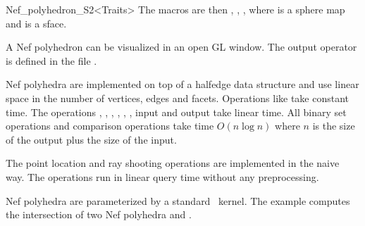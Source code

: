 \begin{ccRefClass}{Nef_polyhedron_S2<Traits>}
The macros are then ,
, ,
 where  is a sphere map
and  is a sface.

 A Nef polyhedron  can be
visualized in an open GL window. The output operator is defined in the
file .
   
\ccImplementation

Nef polyhedra are implemented on top of a halfedge data structure and
use linear space in the number of vertices, edges and facets.
Operations like  take constant time. The operations
, , , ,
, , input and output take linear
time. All binary set operations and comparison operations take time
$O(n \log n)$ where $n$ is the size of the output plus the size of the
input.

The point location and ray shooting operations are implemented in the
naive way. The operations run in linear query time without any
preprocessing.

\ccExample

Nef polyhedra are parameterized by a standard \cgal\ kernel. The example
computes the intersection of two Nef polyhedra  and .


\end{ccRefClass}


